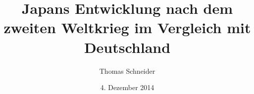 {
}

{
	\usepackage[left = 2cm, right = 2cm, top = 2cm, bottom=3cm]{geometry}
}

\usepackage{polyglossia}
\setmainlanguage[spelling = new, babelshorthands = true]{german}
\usepackage{fontspec}
\usepackage{hyperref}


\title[Japan, Deutschland: Entwicklung nach dem 2.\,WK]
{Japans Entwicklung nach dem zweiten Weltkrieg im Vergleich mit Deutschland}


\author{Thomas Schneider}

\date{4. Dezember 2014}

\newbox\mytempbox
\newdimen\mytempdimen

\newcommand\includegraphicscopyright[3][]{%
	\leavevmode\vbox{\vskip3pt\raggedright\setbox\mytempbox=\hbox{\texttt{[image: \#2]}}%
		\mytempdimen=\wd\mytempbox\box\mytempbox\par\vskip1pt%
		\fontsize{5}{3.5}\selectfont{\color{black}{\vbox{\hsize=\mytempdimen#3}}}\vskip3pt%
	}}